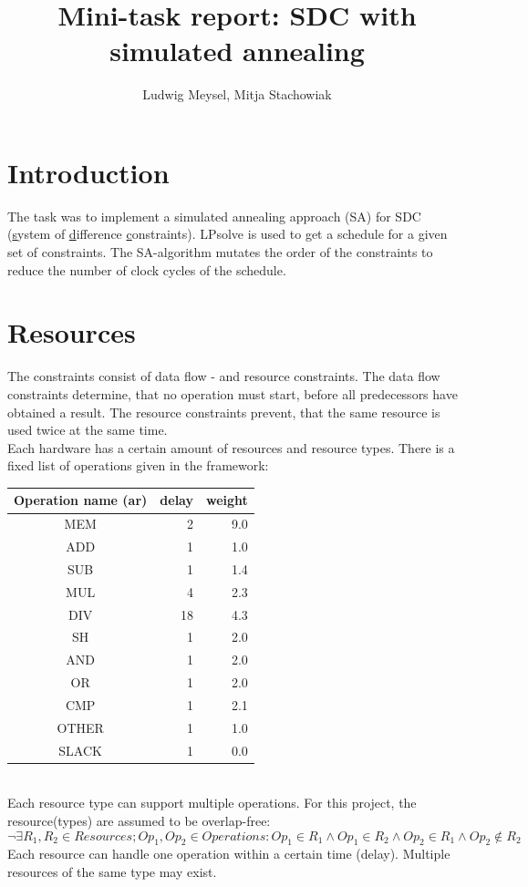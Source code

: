 \documentclass[colorback,accentcolor=tud1c,11pt]{tudreport}
\title{Mini-task report: SDC with simulated annealing}
\subtitle{Ludwig Meysel, Mitja Stachowiak}
\begin{document}
  \maketitle

  \chapter{Introduction}
  The task was to implement a simulated annealing approach (SA) for SDC (\underline{s}ystem of \underline{d}ifference \underline{c}onstraints). LPsolve is used to get a schedule for a given set of constraints. The SA-algorithm mutates the order of the constraints to reduce the number of clock cycles of the schedule.
  
  
  
  \chapter{Resources}
  The constraints consist of data flow - and resource constraints. The data flow constraints determine, that no operation must start, before all predecessors have obtained a result. The resource constraints prevent, that the same resource is used twice at the same time.\\
  Each hardware has a certain amount of resources and resource types. There is a fixed list of operations given in the framework:\\
  \begin{tabular}{ c | r | r }
  	Operation name (ar) & delay & weight \\
  	\hline
  	MEM   &  2 & 9.0 \\
  	ADD   &  1 & 1.0 \\
  	SUB   &  1 & 1.4 \\
  	MUL   &  4 & 2.3 \\
  	DIV   & 18 & 4.3 \\
  	SH    &  1 & 2.0 \\
  	AND   &  1 & 2.0 \\
  	OR    &  1 & 2.0 \\
  	CMP   &  1 & 2.1 \\
  	OTHER &  1 & 1.0 \\
  	SLACK &  1 & 0.0 \\
  \end{tabular}\\
  Each resource type can support multiple operations. For this project, the resource(types) are assumed to be overlap-free:
  $$\neg \exists R_1, R_2 \in Resources; Op_1, Op_2 \in Operations : Op_1 \in R_1 \land Op_1 \in R_2 \land Op_2 \in R_1 \land Op_2 \notin R_2$$
  Each resource can handle one operation within a certain time (delay). Multiple resources of the same type may exist.
  
\end{document}

